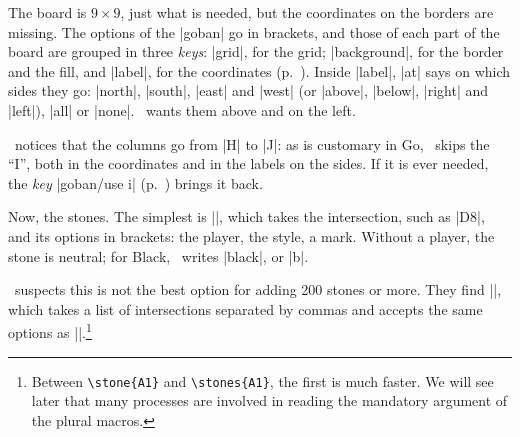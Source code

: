 \begin{goban}
\begin{codeexample}[width=4.4cm]
\begin{goban}
\end{goban}
\end{codeexample}

The board is $9\times 9$, just what is needed, but the coordinates on the borders are missing. The options of the |goban| go in brackets, and those of each part of the board are grouped in three \emph{keys}: |grid|, for the grid; |background|, for the border and the fill, and |label|, for the coordinates (p.~\pageref{sec:tablero}). Inside |label|, |at| says on which sides they go: |north|, |south|, |east| and |west| (or |above|, |below|, |right| and |left|), |all| or |none|. \karu\ wants them above and on the left.

\begin{codeexample}[width=4.7cm]
\begin{goban}[label = {at = {north, west}}]
\end{goban}
\end{codeexample}

\karu\ notices that the columns go from |H| to |J|: as is customary in Go, \pgfgoname\ skips the ``I'', both in the coordinates and in the labels on the sides. If it is ever needed, the \emph{key} |goban/use i| (p.~\pageref{subsec:usei}) brings it back.

Now, the stones. The simplest is |\stone|, which takes the intersection, such as |D8|, and its options in brackets: the player, the style, a mark. Without a player, the stone is neutral; for Black, \karu\ writes |black|, or |b|.

\begin{codeexample}[width=4.8cm]
\begin{goban}[label = {at = {north, west}}]
\end{goban}
\end{codeexample}

\karu\ suspects this is not the best option for adding 200 stones or more. They find |\stones|, which takes a list of intersections separated by commas and accepts the same options as |\stone|.\footnote{Between \texttt{\textbackslash stone\{A1\}} and \texttt{\textbackslash stones\{A1\}}, the first is much faster. We will see later that many processes are involved in reading the mandatory argument of the plural macros.}

\begin{codeexample}[width=4.8cm]
\begin{goban}[label = {at = {north, west}}]
\end{goban}
\end{codeexample}


\end{goban}
